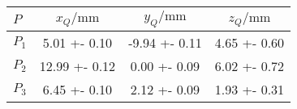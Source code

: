 \begin{tabular}{lSSS}
\toprule

{$P$} & {$x_Q / \si{\milli\metre}$} & {$y_Q / \si{\milli\metre}$} & {$z_Q / \si{\milli\metre}$}\\

\midrule

$P_1$ & 5.01 +- 0.10 & -9.94 +- 0.11 & 4.65 +- 0.60 \\
$P_2$ & 12.99 +- 0.12 & 0.00 +- 0.09 & 6.02 +- 0.72 \\
$P_3$ & 6.45 +- 0.10 & 2.12 +- 0.09 & 1.93 +- 0.31\\

\bottomrule
\end{tabular}